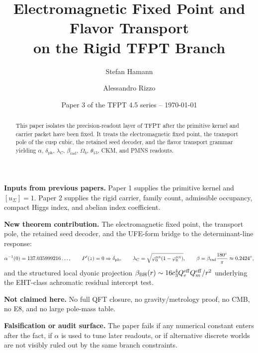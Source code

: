 \documentclass[11pt,a4paper]{article}
\title{\color{tfptblue}\textbf{Electromagnetic Fixed Point and Flavor Transport}\\[0.35em]
{\Large on the Rigid TFPT Branch}}
\author{Stefan Hamann \and Alessandro Rizzo}
\date{{\normalsize\color{tfptgray}\sffamily Paper 3 of the TFPT 4.5 series -- \today}}
\begin{document}
\maketitle

\begin{abstract}
This paper isolates the precision-readout layer of TFPT after the primitive kernel and carrier
packet have been fixed. It treats the electromagnetic fixed point, the transport pole of the cusp
cubic, the retained seed decoder, and the flavor transport grammar yielding $\alpha$,
$\delta_{\mathrm{ph}}$, $\lambda_C$, $\beta_{\mathrm{rad}}$, $\Omega_b$, $\theta_{13}$, CKM, and
PMNS readouts.
\end{abstract}

\begin{tfptfrontbox}
\textbf{Inputs from previous papers.} Paper 1 supplies the primitive kernel and $[u_\Sigma]=1$.
Paper 2 supplies the rigid carrier, family count, admissible occupancy, compact Higgs index, and
abelian index coefficient.

\textbf{New theorem contribution.} The electromagnetic fixed point, the transport pole, the
retained seed decoder, and the UFE-form bridge to the determinant-line response:
\[
\alpha^{-1}(0)=137.035999216\ldots,\qquad
P'(z)=0\Rightarrow\delta_{\mathrm{ph}},\qquad
\lambda_C=\sqrt{\varphi_0^{\mathrm{ret}}(1-\varphi_0^{\mathrm{ret}})},\qquad
\beta=\beta_{\mathrm{rad}}\frac{180^\circ}{\pi}\approx 0.2424^\circ,
\]
and the structured local dyonic projection $\beta_{\mathrm{BH}}(r)\sim 16c_3^4
Q_e^{\mathrm{eff}}Q_m^{\mathrm{eff}}/r^2$ underlying the EHT-class achromatic residual intercept
test.

\textbf{Not claimed here.} No full QFT closure, no gravity/metrology proof, no CMB, no E8, and no
large pole-mass table.

\textbf{Falsification or audit surface.} The paper fails if any numerical constant enters after the
fact, if $\alpha$ is used to tune later readouts, or if alternative discrete worlds are not visibly
ruled out by the same branch constraints.
\end{tfptfrontbox}
\end{document}
